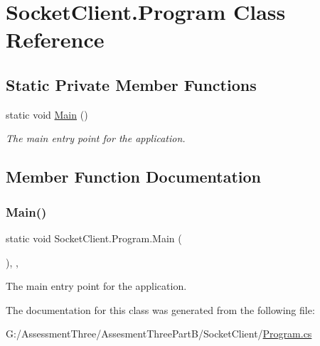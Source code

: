 \hypertarget{class_socket_client_1_1_program}{}\section{Socket\+Client.\+Program Class Reference}
\label{class_socket_client_1_1_program}
\subsection*{Static Private Member Functions}
\begin{DoxyCompactItemize}
\item 
static void \hyperlink{class_socket_client_1_1_program_a0aaf16228df0cf3eb23965d1c8976885}{Main} ()
\begin{DoxyCompactList}\small\item\em The main entry point for the application. \end{DoxyCompactList}\end{DoxyCompactItemize}


\subsection{Member Function Documentation}
\mbox{\label{class_socket_client_1_1_program_a0aaf16228df0cf3eb23965d1c8976885}} 
\subsubsection{\texorpdfstring{Main()}{Main()}}
{\footnotesize\ttfamily static void Socket\+Client.\+Program.\+Main (\begin{DoxyParamCaption}{ }\end{DoxyParamCaption})\hspace{0.3cm}{\ttfamily [inline]}, {\ttfamily [static]}, {\ttfamily [private]}}



The main entry point for the application. 



The documentation for this class was generated from the following file\+:\begin{DoxyCompactItemize}
\item 
G\+:/\+Assessment\+Three/\+Assesment\+Three\+Part\+B/\+Socket\+Client/\hyperlink{_socket_client_2_program_8cs}{Program.\+cs}\end{DoxyCompactItemize}
